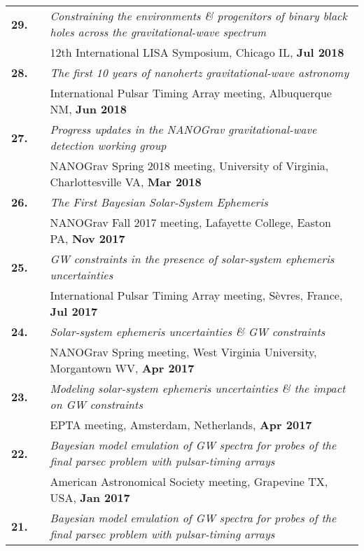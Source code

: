 \documentclass[11pt,letterpaper,sans]{moderncv}
\begin{document}
{\begin{longtable}{rp{0.3cm}p{15.8cm}}
\textbf{29.} & & \textit{Constraining the environments \& progenitors of binary black holes across the gravitational-wave spectrum} \\ 
&& 12th International LISA Symposium, Chicago IL, \textbf{Jul 2018} \vspace{0.09cm}\\
\textbf{28.} & & \textit{The first 10 years of nanohertz gravitational-wave astronomy} \\ 
&& International Pulsar Timing Array meeting, Albuquerque NM, \textbf{Jun 2018} \vspace{0.09cm}\\
\textbf{27.} & & \textit{Progress updates in the NANOGrav gravitational-wave detection working group} \\ 
&& NANOGrav Spring 2018 meeting, University of Virginia, Charlottesville VA, \textbf{Mar 2018} \vspace{0.09cm}\\
\textbf{26.} & & \textit{The First Bayesian Solar-System Ephemeris} \\ 
&& NANOGrav Fall 2017 meeting, Lafayette College, Easton PA, \textbf{Nov 2017} \vspace{0.09cm}\\
\textbf{25.} & & \textit{GW constraints in the presence of solar-system ephemeris uncertainties} \\ 
&& International Pulsar Timing Array meeting, S\`evres, France, \textbf{Jul 2017} \vspace{0.09cm}\\
\textbf{24.} & & \textit{Solar-system ephemeris uncertainties \& GW constraints} \\ 
&& NANOGrav Spring meeting, West Virginia University, Morgantown WV, \textbf{Apr 2017} \vspace{0.09cm}\\
\textbf{23.} & & \textit{Modeling solar-system ephemeris uncertainties \& the impact on GW constraints} \\ 
&& EPTA meeting, Amsterdam, Netherlands, \textbf{Apr 2017} \vspace{0.09cm}\\
\textbf{22.} & & \textit{Bayesian model emulation of GW spectra for probes of the final parsec problem with pulsar-timing arrays} \\ 
&& American Astronomical Society meeting, Grapevine TX, USA, \textbf{Jan 2017} \vspace{0.09cm}\\
\textbf{21.} & & \textit{Bayesian model emulation of GW spectra for probes of the final parsec problem with pulsar-timing arrays} \\ 

\end{longtable}}
\end{document}
